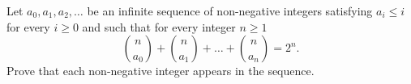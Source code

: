 Let $a_0,a_1,a_2,\ldots$ be an infinite sequence of non-negative integers satisfying
$a_i \leq i$ for every $i \geq 0$ and such that for every integer $n\geq 1$
$$\binom{n}{a_0} + \binom{n}{a_1} + \dots + \binom{n}{a_n} = 2^n.$$
Prove that each non-negative integer appears in the sequence.
